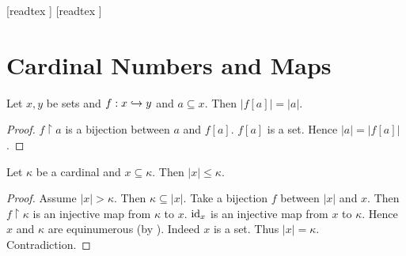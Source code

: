 \documentclass[10pt]{article}
\begin{document}
  \begin{imports}
    \begin{forthel}
      [readtex ]
      [readtex ]
    \end{forthel}
  \end{imports}


  \section*{Cardinal Numbers and Maps}  

  \begin{forthel}
    \begin{proposition}[id=SET_THEORY_06_5513850721927168,printid]
      Let $x, y$ be sets and $f : x \hookrightarrow y$ and $a \subseteq x$.
      Then $|f[a]| = |a|$.
    \end{proposition}
    \begin{proof}
      $f \restriction a$ is a bijection between $a$ and $f[a]$.
      $f[a]$ is a set.
      Hence $|a| = |f[a]|$.
    \end{proof}
  \end{forthel}

  \begin{forthel}
    \begin{proposition}
      Let $\kappa$ be a cardinal and $x \subseteq \kappa$.
      Then $|x| \leq \kappa$.
    \end{proposition}
    \begin{proof}
      Assume $|x| > \kappa$.
      Then $\kappa \subseteq |x|$.
      Take a bijection $f$ between $|x|$ and $x$.
      Then $f \restriction \kappa$ is an injective map from $\kappa$ to $x$.
      $\textrm{id}_{x}$ is an injective map from $x$ to $\kappa$.
      Hence $x$ and $\kappa$ are equinumerous (by ).
      Indeed $x$ is a set.
      Thus $|x| = \kappa$.
      Contradiction.
    \end{proof}
  \end{forthel}
\end{document}
